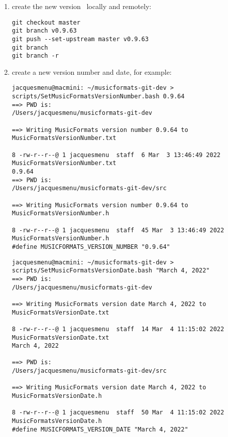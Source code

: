 \begin{enumerate}
\item create the new version \branch\ locally and remotely:
\begin{lstlisting}[language=TerminalSmall]
git checkout master
git branch v0.9.63
git push --set-upstream master v0.9.63
git branch
git branch -r
\end{lstlisting}


\item create a new version number and date, for example:
\begin{lstlisting}[language=TerminalSmall]
jacquesmenu@macmini: ~/musicformats-git-dev > scripts/SetMusicFormatsVersionNumber.bash 0.9.64
==> PWD is:
/Users/jacquesmenu/musicformats-git-dev

==> Writing MusicFormats version number 0.9.64 to MusicFormatsVersionNumber.txt

8 -rw-r--r--@ 1 jacquesmenu  staff  6 Mar  3 13:46:49 2022 MusicFormatsVersionNumber.txt
0.9.64
==> PWD is:
/Users/jacquesmenu/musicformats-git-dev/src

==> Writing MusicFormats version number 0.9.64 to MusicFormatsVersionNumber.h

8 -rw-r--r--@ 1 jacquesmenu  staff  45 Mar  3 13:46:49 2022 MusicFormatsVersionNumber.h
#define MUSICFORMATS_VERSION_NUMBER "0.9.64"
\end{lstlisting}

\begin{lstlisting}[language=Terminal]
jacquesmenu@macmini: ~/musicformats-git-dev > scripts/SetMusicFormatsVersionDate.bash "March 4, 2022"
==> PWD is:
/Users/jacquesmenu/musicformats-git-dev

==> Writing MusicFormats version date March 4, 2022 to MusicFormatsVersionDate.txt

8 -rw-r--r--@ 1 jacquesmenu  staff  14 Mar  4 11:15:02 2022 MusicFormatsVersionDate.txt
March 4, 2022

==> PWD is:
/Users/jacquesmenu/musicformats-git-dev/src

==> Writing MusicFormats version date March 4, 2022 to MusicFormatsVersionDate.h

8 -rw-r--r--@ 1 jacquesmenu  staff  50 Mar  4 11:15:02 2022 MusicFormatsVersionDate.h
#define MUSICFORMATS_VERSION_DATE "March 4, 2022"
\end{lstlisting}

\end{enumerate}
